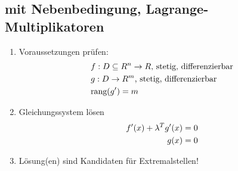 \documentclass[ngerman,a4paper]{article}
\begin{document}
\subsection{mit Nebenbedingung, Lagrange-Multiplikatoren}
	\begin{enumerate}[label=\textbf{\arabic*.}]
		\item Voraussetzungen prüfen: 
		\begin{align}
			& f:D\subseteq R^n\to R\text{, stetig, differenzierbar} \notag \\
			& g: D\to R^m\text{, stetig, differenzierbar}\notag \\
			&\text{rang}(g')=m \notag
		\end{align}
		\item Gleichungssystem lösen
		\begin{align}
			f'(x) + \lambda^Tg'(x)&=0\notag \\
			g(x) &= 0\notag 
		\end{align}
		\item Lösung(en) sind Kandidaten für Extremalstellen!
	\end{enumerate}
\end{document}
